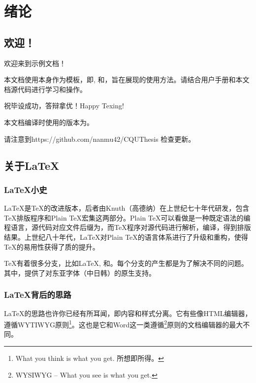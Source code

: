 \chapter{绪论}
\section{欢迎！}
欢迎来到\cquthesis{}示例文档！

本文档使用\cquthesis{}本身作为模板，即, 和，旨在展现\cquthesis{}的使用方法。请结合\cquthesis{}用户手册和本文档源代码进行学习和操作。

祝毕设成功，答辩拿优！Happy Texing!

本文档编译时使用的\cquthesis{}版本为\version{}。

请注意到https://github.com/nanmu42/CQUThesis 检查更新。

\section{关于\LaTeX{}}


\subsection{\LaTeX{}小史}
\LaTeX{}是\TeX{}的改进版本，后者由Knuth（高德纳）在上世纪七十年代研发，包含\TeX{}排版程序和Plain \TeX{}宏集这两部分。Plain \TeX{}可以看做是一种既定语法的编程语言，源代码对应文件后缀为，而\TeX{}程序对源代码进行解析，编译，得到排版结果。上世纪八十年代，\LaTeX{}对Plain \TeX{}的语言体系进行了升级和重构，使得\TeX{}的易用性获得了质的提升。

\TeX{}有着很多分支，比如\LaTeX{}, \LuaTeX{}和\XeTeX{}。每个分支的产生都是为了解决不同的问题。其中，\XeTeX{}提供了对东亚字体（中日韩）的原生支持。


\subsection{\LaTeX{}背后的思路}

\LaTeX{}的思路也许你已经有所耳闻，即{\heiti{}内容和样式分离。}它有些像HTML编辑器，遵循\textsf{WYTIWYG}原则\footnote{What you think is what you get. 所想即所得。}。这也是它和Word这一类遵循\footnote{\textsf{WYSIWYG} -- What you see is what you get.}原则的文档编辑器的最大不同。

